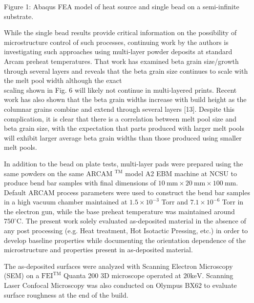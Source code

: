 \documentclass[10pt]{article}
\begin{document}
Figure 1: Abaqus FEA model of heat source and single bead on a semi-infinite substrate.

While the single bead results provide critical information on the possibility of microstructure control of such processes, continuing work by the authors is investigating such approaches using multi-layer powder deposits at standard Arcam preheat temperatures. That work has examined beta grain size/growth through several layers and reveals that the beta grain size continues to scale with the melt pool width although the exact\\
scaling shown in Fig. 6 will likely not continue in multi-layered prints. Recent work has also shown that the beta grain widths increase with build height as the columnar grains combine and extend through several layers [13]. Despite this complication, it is clear that there is a correlation between melt pool size and beta grain size, with the expectation that parts produced with larger melt pools will exhibit larger average beta grain widths than those produced using smaller melt pools.

In addition to the bead on plate tests, multi-layer pads were prepared using the same powders on the same ARCAM ${ }^{\mathrm{TM}}$ model A2 EBM machine at NCSU to produce bend bar samples with final dimensions of $10 \mathrm{~mm} \times 20 \mathrm{~mm} \times 100 \mathrm{~mm}$. Default ARCAM process parameters were used to construct the bend bar samples in a high vacuum chamber maintained at $1.5 \times 10^{-3}$ Torr and $7.1 \times 10^{-6}$ Torr in the electron gun, while the base preheat temperature was maintained around $750^{\circ} \mathrm{C}$. The present work solely evaluated as-deposited material in the absence of any post processing (e.g. Heat treatment, Hot Isotactic Pressing, etc.) in order to develop baseline properties while documenting the orientation dependence of the microstructure and properties present in as-deposited material.

The as-deposited surfaces were analyzed with Scanning Electron Microscopy (SEM) on a $\mathrm{FEI}^{\mathrm{TM}}$ Quanta 200 3D microscope operated at $20 \mathrm{keV}$. Scanning Laser Confocal Microscopy was also conducted on Olympus BX62 to evaluate surface roughness at the end of the build.
\end{document}

